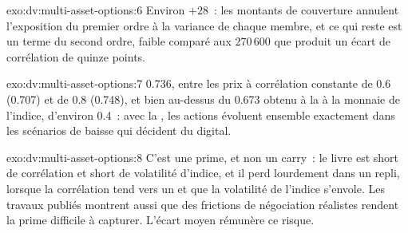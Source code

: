 \begin{solution}{exo:dv:multi-asset-options:6}
Environ $+28$~: les montants de couverture annulent l'exposition du premier ordre à la variance de chaque membre, et ce qui reste est un terme du second
ordre, faible comparé aux 270\,600 que produit un écart de corrélation de quinze points.
\end{solution}

\begin{solution}{exo:dv:multi-asset-options:7}
0.736, entre les prix à corrélation constante de 0.6 (0.707) et de 0.8 (0.748), et bien au-dessus du 0.673 obtenu à la
 à la monnaie de l'indice, d'environ 0.4~: avec la , les actions évoluent ensemble exactement dans les scénarios de baisse
qui décident du digital.
\end{solution}

\begin{solution}{exo:dv:multi-asset-options:8}
C'est une prime, et non un carry~: le livre est short de corrélation et short de volatilité d'indice, et il perd lourdement dans un repli,
lorsque la corrélation tend vers un et que la volatilité de l'indice s'envole. Les travaux publiés montrent aussi que des frictions de négociation réalistes
rendent la prime difficile à capturer. L'écart moyen rémunère ce risque.
\end{solution}

